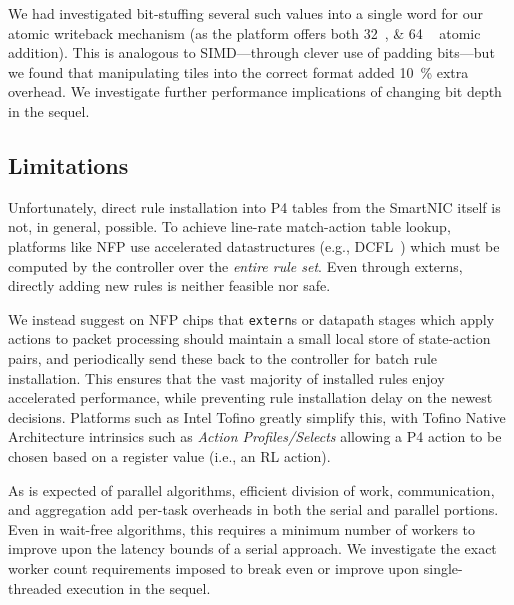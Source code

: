 \documentclass[sigconf,natbib=false]{acmart}
\begin{document}
We had investigated bit-stuffing several such values into a single word for our atomic writeback mechanism (as the platform offers both \SIlist{32;64
}{\bit} atomic addition).
This is analogous to SIMD---through clever use of padding bits---but we found that manipulating tiles into the correct format added \SI{10}{\percent} extra overhead.
We investigate further performance implications of changing bit depth in the sequel.

%
%
%

\subsection{Limitations}\label{sec:limitations}
Unfortunately, direct rule installation into P4 tables from the SmartNIC itself is not, in general, possible.
To achieve line-rate match-action table lookup, platforms like NFP use accelerated datastructures (e.g., DCFL~\parencite{DBLP:conf/infocom/TaylorT05}) which must be computed by the controller over the \emph{entire rule set}.
Even through externs, directly adding new rules is neither feasible nor safe.

We instead suggest on NFP chips that \texttt{extern}s or datapath stages which apply actions to packet processing should maintain a small local store of state-action pairs, and periodically send these back to the controller for batch rule installation.
This ensures that the vast majority of installed rules enjoy accelerated performance, while preventing rule installation delay on the newest decisions.
Platforms such as Intel Tofino greatly simplify this, with Tofino Native Architecture intrinsics such as \emph{Action Profiles/Selects} allowing a P4 action to be chosen based on a register value (i.e., an RL action).

As is expected of parallel algorithms, efficient division of work, communication, and aggregation add per-task overheads in both the serial and parallel portions.
Even in wait-free algorithms, this requires a minimum number of workers to improve upon the latency bounds of a serial approach.
We investigate the exact worker count requirements imposed to break even or improve upon single-threaded execution in the sequel.
\end{document}
